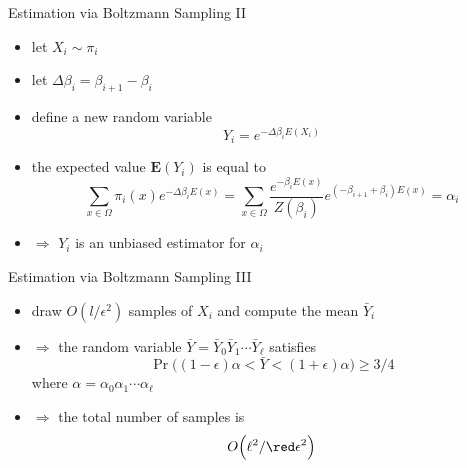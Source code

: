 \documentclass[slideColor]{prosper}
\newcommand{\E}{\mathbf{E}}
\renewcommand{\>}{\rangle}
\newcommand{\<}{\langle}
\begin{document}
\begin{slide}{Estimation via Boltzmann Sampling II}
\begin{itemize}
\item let $X_i \sim \pi_i$

\medskip
\item let $\Delta\beta_i = \beta_{i+1} - \beta_i$ 

\medskip
\item define a new random variable 
\[
Y_i = e^{-\Delta\beta_i E(X_i)}
\]
 
\item the expected value $\E(Y_i)$ is equal to
\[
\sum_{x \in \Omega}
\pi_i(x) 
e^{-\Delta\beta_i E(x)}  =
\sum_{x \in \Omega}
\frac{e^{-\beta_i E(x)}}{Z(\beta_i)} 
e^{(-\beta_{i+1} + \beta_i) E(x)}  
= 
\alpha_i
\]
\item $\Rightarrow$ $Y_i$ is an unbiased estimator for $\alpha_i$
\end{itemize}
\end{slide}


\begin{slide}{Estimation via Boltzmann Sampling III}
\begin{itemize}
\item draw $O(l/\epsilon^2)$ samples of $X_i$ and compute the mean $\bar{Y}_i$

\medskip
\item $\Rightarrow$ the random variable $\bar{Y}=\bar{Y}_0 \bar{Y}_1 \cdots \bar{Y}_{\ell}$ satisfies
\[
\Pr\Big(
(1-\epsilon) \alpha < \bar{Y} < (1+\epsilon) \alpha
\Big)
\ge 3/4
\]
where $\alpha=\alpha_0\alpha_1\cdots\alpha_\ell$

\medskip
\item $\Rightarrow$ the total number of samples is
\[
O\Big(\ell^2 / {\red \epsilon^2} \Big)
\] 
\end{itemize}
\end{slide}

\end{document}
